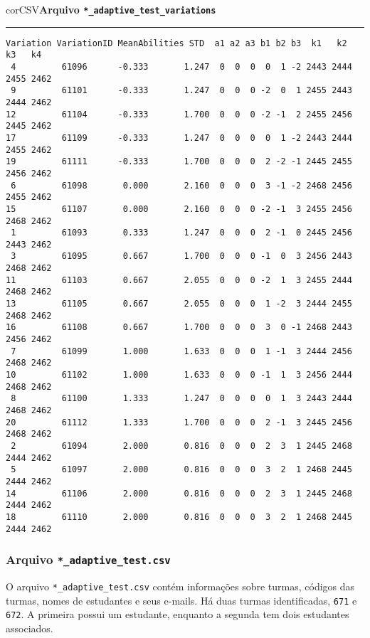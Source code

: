\begin{myboxCode}{corCSV}{\textbf{Arquivo \texttt{*\_adaptive\_test\_variations}}}\vspace{3mm}
\hrule
\begin{verbatim}
Variation VariationID MeanAbilities STD  a1 a2 a3 b1 b2 b3  k1   k2   k3   k4
 4         61096      -0.333       1.247  0  0  0  0  1 -2 2443 2444 2455 2462
 9         61101      -0.333       1.247  0  0  0 -2  0  1 2455 2443 2444 2462
12         61104      -0.333       1.700  0  0  0 -2 -1  2 2455 2456 2445 2462
17         61109      -0.333       1.247  0  0  0  0  1 -2 2443 2444 2455 2462
19         61111      -0.333       1.700  0  0  0  2 -2 -1 2445 2455 2456 2462
 6         61098       0.000       2.160  0  0  0  3 -1 -2 2468 2456 2455 2462
15         61107       0.000       2.160  0  0  0 -2 -1  3 2455 2456 2468 2462
 1         61093       0.333       1.247  0  0  0  2 -1  0 2445 2456 2443 2462
 3         61095       0.667       1.700  0  0  0 -1  0  3 2456 2443 2468 2462
11         61103       0.667       2.055  0  0  0 -2  1  3 2455 2444 2468 2462
13         61105       0.667       2.055  0  0  0  1 -2  3 2444 2455 2468 2462
16         61108       0.667       1.700  0  0  0  3  0 -1 2468 2443 2456 2462
 7         61099       1.000       1.633  0  0  0  1 -1  3 2444 2456 2468 2462
10         61102       1.000       1.633  0  0  0 -1  1  3 2456 2444 2468 2462
 8         61100       1.333       1.247  0  0  0  0  1  3 2443 2444 2468 2462
20         61112       1.333       1.700  0  0  0  2 -1  3 2445 2456 2468 2462
 2         61094       2.000       0.816  0  0  0  2  3  1 2445 2468 2444 2462
 5         61097       2.000       0.816  0  0  0  3  2  1 2468 2445 2444 2462
14         61106       2.000       0.816  0  0  0  2  3  1 2445 2468 2444 2462
18         61110       2.000       0.816  0  0  0  3  2  1 2468 2445 2444 2462
\end{verbatim}
\end{myboxCode}

\subsubsection{Arquivo \texttt{*\_adaptive\_test.csv}}\label{sec:adaptive_test}

O arquivo \verb|*_adaptive_test.csv| contém informações sobre  turmas, códigos das  turmas, nomes de estudantes e seus e-mails. Há duas  turmas identificadas, \verb|671| e \verb|672|. A primeira possui um estudante, enquanto a segunda tem dois estudantes associados.

